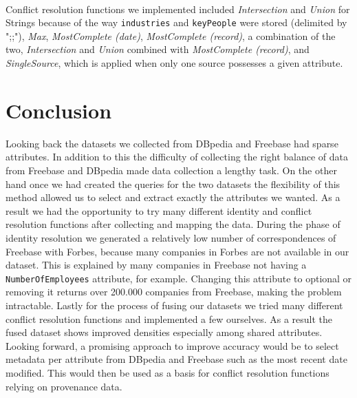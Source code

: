 \paragraph{}Conflict resolution functions we implemented included \textit{Intersection} and \textit{Union} for Strings because of the way \texttt{industries} and \texttt{keyPeople} were stored (delimited by ";;"), \textit{Max}, \textit{MostComplete (date)}, \textit{MostComplete (record)}, a combination of the two, \textit{Intersection} and \textit{Union} combined with \textit{MostComplete (record)}, and \textit{SingleSource}, which is applied when only one source possesses a given attribute.









\section{Conclusion}
Looking back the datasets we collected from DBpedia and Freebase had sparse attributes. In addition to this the difficulty of collecting the right balance of data from Freebase and DBpedia made data collection a lengthy task. On the other hand once we had created the queries for the two datasets the flexibility of this method allowed us to select and extract exactly the attributes we wanted. As a result we had the opportunity to try many different identity and conflict resolution functions after collecting and mapping the data. During the phase of identity resolution we generated a relatively low number of correspondences of Freebase with Forbes, because many companies in Forbes are not available in our dataset. This is explained by many companies in Freebase not having a \texttt{NumberOfEmployees} attribute, for example. Changing this attribute to optional or removing it returns over 200.000 companies from Freebase, making the problem intractable. Lastly for the process of fusing our datasets we tried many different conflict resolution functions and implemented a few ourselves. As a result the fused dataset shows improved densities especially among shared attributes. Looking forward, a promising approach to improve accuracy would be to select metadata per attribute from DBpedia and Freebase such as the most recent date modified. This would then be used as a basis for conflict resolution functions relying on provenance data. 
















